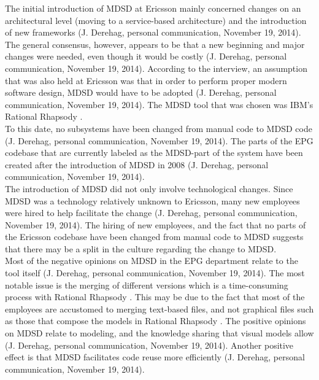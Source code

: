 \documentclass[final_report_innit.tex]{subfiles}
\begin{document}
The initial introduction of MDSD at Ericsson mainly concerned changes on an architectural level (moving to a service-based architecture) and the introduction of new frameworks (J. Derehag, personal communication, November 19, 2014). The general consensus, however, appears to be that a new beginning and major changes were needed, even though it would be costly (J. Derehag, personal communication, November 19, 2014). According to the interview, an assumption that was also held at Ericsson was that in order to perform proper modern software design, MDSD would have to be adopted (J. Derehag, personal communication, November 19, 2014). The MDSD tool that was chosen was IBM’s Rational Rhapsody \cite{rrf}.
\\

To this date, no subsystems have been changed from manual code to MDSD code (J. Derehag, personal communication, November 19, 2014). The parts of the EPG codebase that are currently labeled as the MDSD-part of the system have been created after the introduction of MDSD in 2008 (J. Derehag, personal communication, November 19, 2014). 
\\

The introduction of MDSD did not only involve technological changes. Since MDSD was a technology relatively unknown to Ericsson, many new employees were hired to help facilitate the change (J. Derehag, personal communication, November 19, 2014). The hiring of new employees, and the fact that no parts of the Ericsson codebase have been changed from manual code to MDSD suggests that there may be a split in the culture regarding the change to MDSD. 
\\

Most of the negative opinions on MDSD in the EPG department relate to the tool \cite{rrf} itself (J. Derehag, personal communication, November 19, 2014). The most notable issue is the merging of different versions which is a time-consuming process with Rational Rhapsody \cite{rrf}. This may be due to the fact that most of the employees are accustomed to merging text-based files, and not graphical files such as those that compose the models in Rational Rhapsody \cite{rrf}. The positive opinions on MDSD relate to modeling, and the knowledge sharing that visual models allow (J. Derehag, personal communication, November 19, 2014). Another positive effect is that MDSD facilitates code reuse more efficiently (J. Derehag, personal communication, November 19, 2014). 
\end{document}
